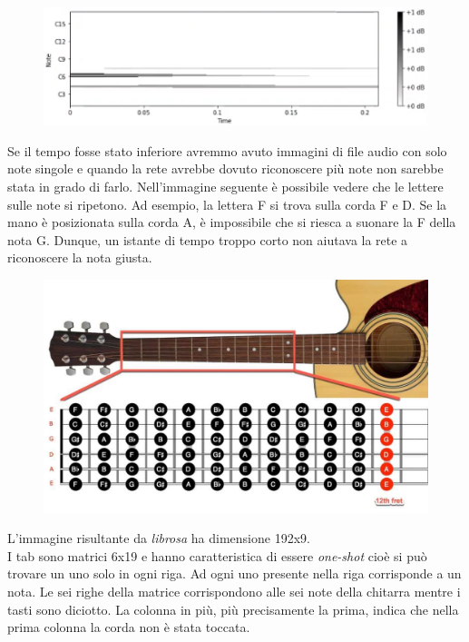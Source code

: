 \begin{figure}[H]
	\centering
	\includegraphics[scale=0.90]{./images/img7.png}
\end{figure}
Se il tempo fosse stato inferiore avremmo avuto immagini di file audio con solo note singole e quando la rete avrebbe dovuto riconoscere più note non sarebbe stata in grado di farlo. Nell'immagine seguente è possibile vedere che le lettere sulle note si ripetono. Ad esempio, la lettera F si trova sulla corda F e D. Se la mano è posizionata sulla corda A, è impossibile che si riesca a suonare la F della nota G. Dunque, un istante di tempo troppo corto non aiutava la rete a riconoscere la nota giusta.

\begin{figure}[H]
	\centering
	\includegraphics[scale=0.20]{./images/img12.jpg}
\end{figure}

L'immagine risultante da \textit{librosa} ha dimensione 192x9.\\

I tab sono matrici 6x19 e hanno caratteristica di essere \textit{one-shot} cioè si può trovare un uno solo in ogni riga. Ad ogni uno presente nella riga corrisponde a un nota. Le sei righe della matrice corrispondono alle sei note della chitarra mentre i tasti sono diciotto. La colonna in più, più precisamente la prima, indica che nella prima colonna la corda non è stata toccata.

